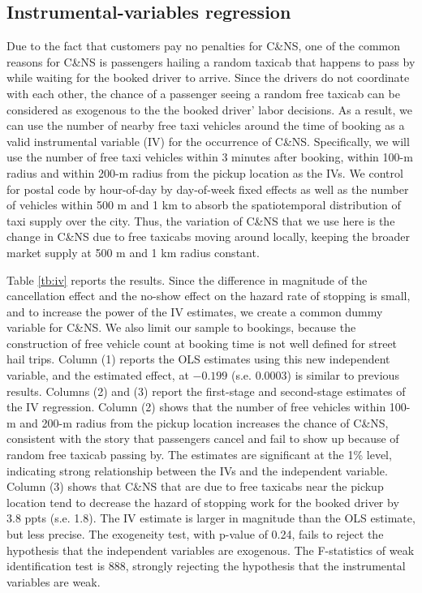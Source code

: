 \documentclass[reviewmode]{restat}
\begin{document}
\begin{appendices}
\section{Instrumental-variables regression}
\label{apx:iv}
Due to the fact that customers pay no penalties for C\&NS, one of the common reasons for C\&NS 
is passengers hailing a random taxicab that happens to pass by while waiting for the booked driver to arrive. 
Since the drivers do not coordinate with each other, the chance of a passenger seeing a random
free taxicab can be considered as exogenous to the the booked driver' labor decisions.
As a result, we can use the number of nearby free taxi vehicles around the time of 
booking as a valid instrumental variable (IV) for the occurrence of C\&NS.
Specifically, we will use the number of free taxi vehicles within 3 minutes after booking, 
within 100-m radius and within 200-m radius from the pickup location as the IVs. We control for postal code by hour-of-day by day-of-week fixed effects as
well as the number of vehicles within 500 m and 1 km to absorb the spatiotemporal distribution
of taxi supply over the city. Thus, the variation of C\&NS that we use here is the change in C\&NS
due to free taxicabs moving around locally, keeping the broader market supply at 500 m and 1 km 
radius constant. 

Table \ref{tb:iv} reports the results. Since the difference in magnitude of the cancellation effect
and the no-show effect on the hazard rate of stopping is small, 
and to increase the power of the IV estimates, we create
a common dummy variable for C\&NS. We also limit our sample to bookings, because the construction
of free vehicle count at booking time is not well defined for street hail trips.
Column (1) reports the OLS estimates using this new
independent variable, and the estimated effect, at $-0.199$ (s.e. $0.0003$) is similar 
to previous results.
Columns (2) and (3) report the first-stage and second-stage estimates of the IV regression.
Column (2) shows that the number of free vehicles within 100-m and 200-m radius from 
the pickup location increases the chance of C\&NS, consistent with the story that
passengers cancel and fail to show up because of random free taxicab passing by.
The estimates are significant at the 1\% level, indicating strong relationship between the IVs
 and the independent variable.
Column (3) shows that C\&NS  that are due to free taxicabs near the pickup location
tend to decrease the hazard of stopping work for the booked driver by 3.8 ppts (s.e. 1.8).
The IV estimate is larger in magnitude than the OLS estimate, but less precise.
The exogeneity test, with p-value of 0.24, fails to reject the hypothesis that
the independent variables are exogenous. The F-statistics of weak identification test is 888, strongly rejecting the hypothesis that the instrumental variables are weak.



\end{appendices}
\end{document}

